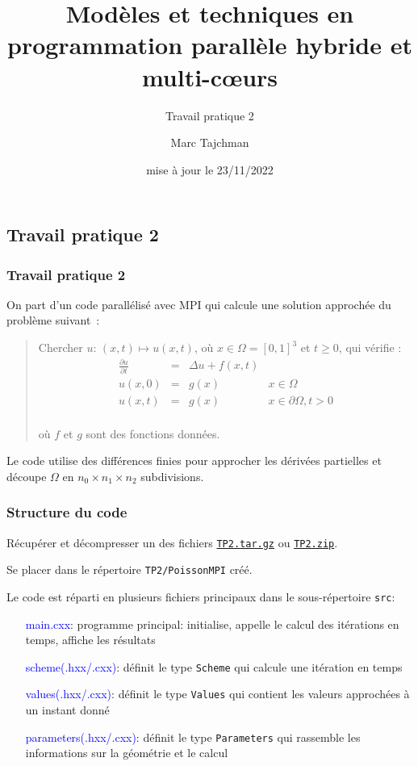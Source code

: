 \documentclass{beamer}
\title{Modèles et techniques en programmation parallèle hybride et multi-c\oe urs}
\subtitle{Travail pratique 2}
\author{Marc Tajchman}\institute{CEA - DEN/DM2S/STMF/LMES}
\date{mise à jour le 23/11/2022}
\newcommand\Frac[2]{\frac{\displaystyle #1}{\displaystyle #2}}
\begin{document}
\begin{frame}
	\titlepage
\end{frame}

\large
\begin{frame}
	\section{Travail pratique 2}
	\frametitle{Travail pratique 2}

On part d'un code parallélisé avec MPI qui calcule une solution approchée du problème suivant~:

\medskip
\begin{quote}
Chercher $u$:  $(x, t) \mapsto u(x, t)$, où  $x \in \Omega = [0,1]^3$ et $t \geq 0$, qui vérifie :
$$
\begin{array}{lcll}
\Frac{\partial u}{\partial t} & = & \Delta u + f(x, t) & \\[0.3cm]
u(x, 0) &=& g(x) & x\in \Omega \\[0.3cm]
u(x, t) & = & g(x) & x\in\partial \Omega, t > 0\\[0.3cm]
\end{array}
$$

\vspace{-0.6cm}
où $f$ et $g$ sont des fonctions données.
\end{quote}

Le code utilise des différences finies pour approcher les dérivées partielles et découpe $\Omega$ en $n_0\times n_1\times n_2$ subdivisions.

\end{frame}

\begin{frame}
	\frametitle{Structure du code}
	
	Récupérer et décompresser un des fichiers \href{https://perso.ensta-paris.fr/~tajchman/Seance5/TP2.tar.gz}{\tt TP2.tar.gz} ou \href{https://perso.ensta-paris.fr/~tajchman/Seance5/TP2.zip}{\tt TP2.zip}.
	
    \medskip
	 Se placer dans le répertoire {\tt TP2/PoissonMPI} créé. 
	
	Le code est réparti en plusieurs fichiers principaux dans le sous-répertoire {\tt src}:
    \medskip
    
	\hfill\begin{minipage}{8cm}
	\begin{itemize}
		\item[\textcolor{blue}{main.cxx}:] programme principal: initialise, appelle le calcul des itérations en temps, affiche les résultats 
		\item[\textcolor{blue}{scheme(.hxx/.cxx)}:] définit le type {\tt Scheme} qui calcule une itération en temps
		\item[\textcolor{blue}{values(.hxx/.cxx)}:] définit le type {\tt Values} qui contient les valeurs approchées à un instant donné
		\item[\textcolor{blue}{parameters(.hxx/.cxx)}:] définit le type {\tt Parameters} qui rassemble les informations sur la géométrie et le calcul
	\end{itemize}
    \end{minipage}
\vfill
\end{frame}
\end{document}

